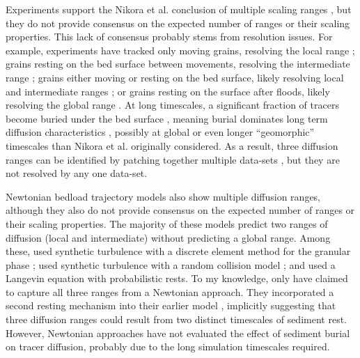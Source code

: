 Experiments support the Nikora et al. conclusion of multiple scaling ranges \citep{Martin2012,Fathel2016}, but they do not provide consensus on the expected number of ranges or their scaling properties.
This lack of consensus probably stems from resolution issues.
For example, experiments have tracked only moving grains, resolving the local range \citep{Furbish2012,Furbish2017,Fathel2016}; grains resting on the bed surface between movements, resolving the intermediate range \citep{Einstein1937,Yano1969,Nakagawa1976}; grains either moving or resting on the bed surface, likely resolving local and intermediate ranges \citep{Martin2012}; or grains resting on the surface after floods, likely resolving the global range \citep{Phillips2013,Bradley2017}. 
At long timescales, a significant fraction of tracers become buried under the bed surface \citep{Hassan1991,Hassan2013,Ferguson2002a,Haschenburger2013,Papangelakis2016}, meaning burial dominates long term diffusion characteristics \citep{Bradley2017,Martin2014,Voepel2013}, possibly at global or even longer ``geomorphic'' timescales \citep{Hassan2017} than Nikora et al. originally considered.
As a result, three diffusion ranges can be identified by patching together multiple data-sets \citep{Zhang2012,Nikora2002}, but they are not resolved by any one data-set.

Newtonian bedload trajectory models also show multiple diffusion ranges, although they also do not provide consensus on the expected number of ranges or their scaling properties. 
The majority of these models predict two ranges of diffusion (local and intermediate) without predicting a global range.
Among these, \citet{Nikora2001a} used synthetic turbulence \citep{Kraichnan1970} with a discrete element method for the granular phase \citep{Cundall1979}; \citet{Bialik2012} used synthetic turbulence with a random collision model \citep{Sekine1992}; and \citet{Fan2016} used a Langevin equation with probabilistic rests.
To my knowledge, only \citet{Bialik2015} have claimed to capture all three ranges from a Newtonian approach.
They incorporated a second resting mechanism into their earlier model \citep{Bialik2012}, implicitly suggesting that three diffusion ranges could result from two distinct timescales of sediment rest.
However, Newtonian approaches have not evaluated the effect of sediment burial on tracer diffusion, probably due to the long simulation timescales required. 


